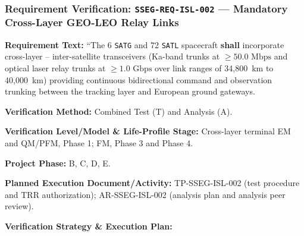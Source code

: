 \subsubsection{Requirement Verification: \texttt{SSEG-REQ-ISL-002} --- Mandatory Cross-Layer GEO-LEO Relay Links}
\label{ver:SSEG-REQ-ISL-002}
\textbf{Requirement Text:} ``The 6 \texttt{SATG} and 72 \texttt{SATL} spacecraft \textbf{shall} incorporate cross-layer -- inter-satellite transceivers (Ka-band  trunks at $\ge 50.0\text{ Mbps}$ and optical laser relay trunks at $\ge 1.0\text{ Gbps}$ over link ranges of 34,800~km to 40,000~km) providing continuous bidirectional command and observation trunking between the  tracking layer and European ground gateways.
\par\textbf{Verification Method:} Combined Test (T) and Analysis (A).
\par\textbf{Verification Level/Model \& Life-Profile Stage:} Cross-layer terminal EM and QM/PFM, Phase 1; FM, Phase 3 and Phase 4.
\par\textbf{Project Phase:} B, C, D, E.
\par\textbf{Planned Execution Document/Activity:} TP-SSEG-ISL-002 (test procedure and TRR authorization); AR-SSEG-ISL-002 (analysis plan and analysis peer review).
\par\textbf{Verification Strategy \& Execution Plan:}
